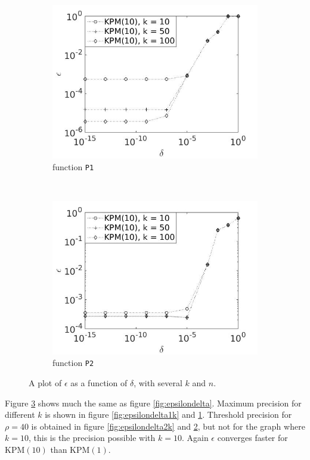 \begin{figure}[H]
\begin{subfigure}[b]{0.45\textwidth}
                \includegraphics[width=\textwidth]{fig/s22errvstol1k10}
                \caption{function \texttt{P1}}
                \label{fig:epsilondelta3k}
        \end{subfigure}
~
        \begin{subfigure}[b]{0.45\textwidth}
                \includegraphics[width=\textwidth]{fig/s23errvstol2k10}
                \caption{ function \texttt{P2}}
                \label{fig:epsilondelta4k}
        \end{subfigure}
        \caption{A plot of $\epsilon$ as a function of $\delta$, with several $k$ and $n$.} \label{fig:epsilondeltak}
\end{figure}
Figure \ref{fig:epsilondeltak} shows much the same as figure \ref{fig:epsilondelta}. Maximum precision for different $k$ is shown in figure \ref{fig:epsilondelta1k} and \ref{fig:epsilondelta3k}.
Threshold precision for $\rho = 40$ is obtained in figure \ref{fig:epsilondelta2k} and \ref{fig:epsilondelta4k}, but not for the graph where $k = 10$, this is the precision possible with $k=10$. Again $\epsilon$ converges faster for KPM$(10)$ than KPM$(1)$. \\

